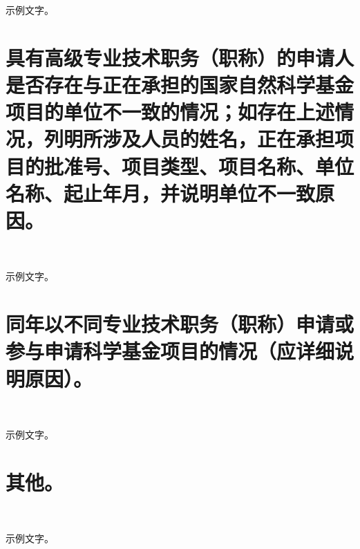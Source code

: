 \documentclass[12pt,a4paper]{article}
\begin{document}
示例文字。

\section{具有高级专业技术职务（职称）的申请人是否存在与正在承担的国家自然科学基金项目的单位不一致的情况；如存在上述情况，列明所涉及人员的姓名，正在承担项目的批准号、项目类型、项目名称、单位名称、起止年月，并说明单位不一致原因。}\

示例文字。

\section{同年以不同专业技术职务（职称）申请或参与申请科学基金项目的情况（应详细说明原因）。}\

示例文字。

\section{其他。}\

示例文字。
\end{document}
